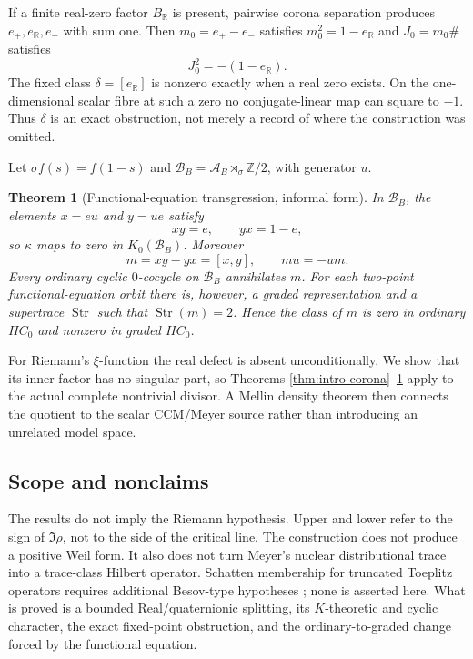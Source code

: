 \documentclass[11pt]{article}
\newtheorem{theorem}{Theorem}[section]
\theoremstyle{definition}
\theoremstyle{remark}
\newcommand{\R}{\mathbb R}
\newcommand{\Z}{\mathbb Z}
\newcommand{\A}{\mathcal A}
\newcommand{\B}{\mathcal B}
\newcommand{\Str}{\operatorname{Str}}
\begin{document}
If a finite real-zero factor $B_{\R}$ is present, pairwise corona separation
produces $e_+,e_{\R},e_-$ with sum one.  Then $m_0=e_+-e_-$ satisfies
$m_0^2=1-e_{\R}$ and $J_0=m_0\#$ satisfies
\[
                     J_0^2=-(1-e_{\R}).                 \tag{1.1}
\]
The fixed class $\delta=[e_{\R}]$ is nonzero exactly when a real zero exists.
On the one-dimensional scalar fibre at such a zero no conjugate-linear map can
square to $-1$.  Thus $\delta$ is an exact obstruction, not merely a record of
where the construction was omitted.

Let $\sigma f(s)=f(1-s)$ and
$\B_B=\A_B\rtimes_\sigma\Z/2$, with generator $u$.

\begin{theorem}[Functional-equation transgression, informal form]
\label{thm:intro-crossed}
In $\B_B$, the elements $x=eu$ and $y=ue$ satisfy
\[
       xy=e,\qquad yx=1-e,
\]
so $\kappa$ maps to zero in $K_0(\B_B)$.  Moreover
\[
       m=xy-yx=[x,y],\qquad mu=-um.                    \tag{1.2}
\]
Every ordinary cyclic $0$-cocycle on $\B_B$ annihilates $m$.  For each
two-point functional-equation orbit there is, however, a graded representation
and a supertrace $\Str$ such that $\Str(m)=2$.  Hence the class of $m$ is zero in
ordinary $HC_0$ and nonzero in graded $HC_0$.
\end{theorem}

For Riemann's $\xi$-function the real defect is absent unconditionally.  We show
that its inner factor has no singular part, so Theorems
\ref{thm:intro-corona}--\ref{thm:intro-crossed} apply to the actual complete
nontrivial divisor.  A Mellin density theorem then connects the quotient to the
scalar CCM/Meyer source rather than introducing an unrelated model space.

\subsection{Scope and nonclaims}

The results do not imply the Riemann hypothesis.  Upper and lower refer to the
sign of $\Im\rho$, not to the side of the critical line.  The construction does
not produce a positive Weil form.  It also does not turn Meyer's nuclear
distributional trace into a trace-class Hilbert operator.  Schatten membership
for truncated Toeplitz operators requires additional Besov-type hypotheses
\cite{LopattoRochberg2016}; none is asserted here.  What is proved is a bounded
Real/quaternionic splitting, its $K$-theoretic and cyclic character, the exact
fixed-point obstruction, and the ordinary-to-graded change forced by the
functional equation.
\end{document}
